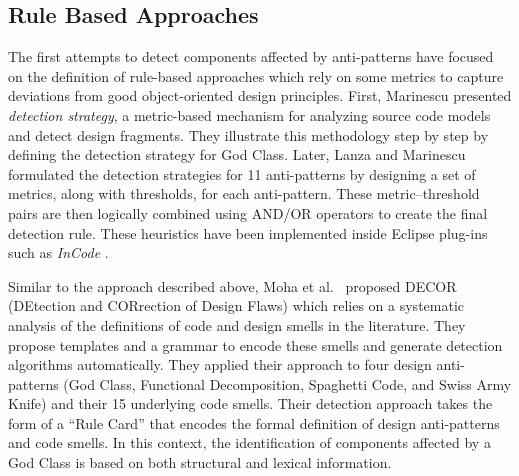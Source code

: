 \subsection{Rule Based Approaches}
The first attempts to detect components affected by anti-patterns have focused on the definition of rule-based approaches which rely on some metrics to capture deviations from good object-oriented design principles.
First, Marinescu \cite{marinescu2004detection} presented \textit{detection strategy}, a metric-based mechanism for analyzing source code models and detect design fragments. They illustrate this methodology step by step by defining the detection strategy for God Class. Later, Lanza and Marinescu \cite{lanza2007object} formulated the detection strategies for 11 anti-patterns by designing a set of metrics, along with thresholds, for each anti-pattern. These metric--threshold pairs are then logically combined using AND/OR operators to create the final detection rule. These heuristics have been implemented inside Eclipse plug-ins such as \textit{InCode} \cite{marinescu2010incode}.

Similar to the approach described above, Moha et al.~\cite{Moha10-TSE-DECOR} proposed DECOR (DEtection and CORrection of Design Flaws) which relies on a systematic analysis of the definitions of code and design smells in the literature. They propose templates and a grammar to encode these smells and generate detection algorithms automatically. They applied their approach to four design anti-patterns (God Class, Functional  Decomposition, Spaghetti Code, and Swiss Army Knife) and their 15 underlying code smells. Their detection approach takes the form of a ``Rule Card'' that encodes the formal definition of design anti-patterns and code smells. In this context, the identification of components affected by a God Class is based on both structural and lexical information.


